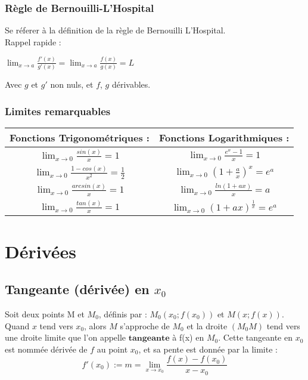 \documentclass[12pt, a4paper]{book}
\begin{document}
\subsubsection{Règle de Bernouilli-L'Hospital}
Se réferer à la définition de la règle de Bernouilli L'Hospital.\\
Rappel rapide :\\
\begin{center}
    $\lim_{x \to a} \frac{f'(x)}{g'(x)} = \lim_{x \to a} \frac{f(x)}{g(x)}  = L$
\end{center}
\textit{}{Avec $g$ et $g'$ non nuls, et $f$, $g$ dérivables.}
\subsubsection{Limites remarquables}
\begin{tabular}{ |c | c| } 
    \hline
Fonctions Trigonométriques :&Fonctions Logarithmiques :\\
\hline
    $\lim_{x \to 0} \frac{sin(x)}{x} = 1$& $\lim_{x \to 0} \frac{e^x-1}{x} = 1$\\
    $\lim_{x \to 0} \frac{1-cos(x)}{x^2} = \frac{1}{2}$&$\lim_{x \to 0} (1 + \frac{a}{x})^x = e^a$\\
    $\lim_{x \to 0} \frac{arcsin(x)}{x} = 1$&$\lim_{x \to 0} \frac{ln(1+ax)}{x} = a$\\
    $\lim_{x \to 0} \frac{tan(x)}{x} = 1$&$\lim_{x \to 0} (1+ax)^\frac{1}{x} = e^a$
\end{tabular}


\newpage
\section{Dérivées}
        \subsection{Tangeante (dérivée) en $x_0$}
            Soit deux points M et $M_0$, définis par : $M_0(x_0;f(x_0))$ et $M(x;f(x))$.\\
            Quand $x$ tend vers $x_0$, alors $M$ s'approche de $M_0$ et la droite $(M_0M)$
            tend vers une droite limite que l'on appelle $\mathbf{tangeante}$ à f(x) en $M_0$.
            Cette tangeante en $x_0$ est nommée dérivée de $f$ au point $x_0$, et sa pente est donnée par la limite :\\
            $$
            \boxed{
            f'(x_0) := m = \lim_{x \to x_0} \frac{f(x)-f(x_0)}{x-x_0}
            }
            $$
\end{document}
